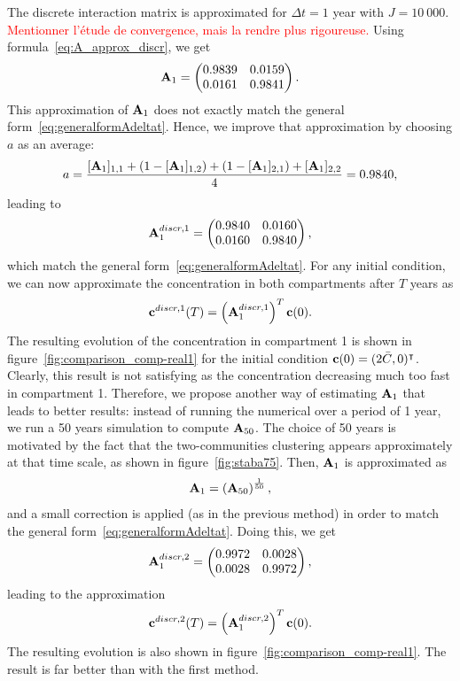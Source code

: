 The discrete interaction matrix is approximated for $\Delta t = 1$ year with $J = 10\ 000$. \textcolor{red}{Mentionner l'étude de convergence, mais la rendre plus rigoureuse.} Using formula~\eqref{eq:A_approx_discr}, we get
\begin{equation}
	\mathbf A_1 = \begin{pmatrix}
		0.9839 & 0.0159 \\ 
		0.0161 & 0.9841
	\end{pmatrix}.
\end{equation}
This approximation of $\mathbf A_1$ does not exactly match the general form~\eqref{eq:generalformAdeltat}. Hence, we improve that approximation by choosing $a$ as an average:
\begin{equation}
	a = \frac{[\mathbf A_1]_{1,1} + (1-[\mathbf A_1]_{1,2}) + (1 - [\mathbf A_1]_{2,1}) + [\mathbf A_1]_{2,2}}{4} = 0.9840,
\end{equation}
leading to
\begin{equation}
	\mathbf A_1^{discr,1} = \begin{pmatrix}
		0.9840 & 0.0160 \\ 
		0.0160 & 0.9840
	\end{pmatrix},
\end{equation}
which match the general form~\eqref{eq:generalformAdeltat}. For any initial condition, we can now approximate the concentration in both compartments after $T$ years as
\begin{equation}
	\mathbf c^{discr,1}(T) = \left(\mathbf A_1^{discr,1}\right)^T \mathbf c(0).
\end{equation}
The resulting evolution of the concentration in compartment 1 is shown in figure~\ref{fig:comparison_comp-real1} for the initial condition $\mathbf c(0) = (2\bar C,0)^\intercal$. Clearly, this result is not satisfying as the concentration decreasing much too fast in compartment 1. Therefore, we propose another way of estimating $\mathbf A_1$ that leads to better results: instead of running the numerical over a period of 1 year, we run a 50 years simulation to compute $\mathbf A_{50}$. The choice of 50 years is motivated by the fact that the two-communities clustering appears approximately at that time scale, as shown in figure~\ref{fig:staba75}. Then, $\mathbf A_1$ is approximated as
\begin{equation}
	\mathbf A_1 = \left(\mathbf A_{50}\right)^{\frac{1}{50}},
\end{equation}
and a small correction is applied (as in the previous method) in order to match the general form~\eqref{eq:generalformAdeltat}. Doing this, we get
\begin{equation}
	\mathbf A_1^{discr,2} = \begin{pmatrix}
		0.9972 & 0.0028 \\ 
		0.0028 & 0.9972
	\end{pmatrix},
\end{equation}
leading to the approximation
\begin{equation}
	\mathbf c^{discr,2}(T) = \left(\mathbf A_1^{discr,2}\right)^T \mathbf c(0).
\end{equation}
The resulting evolution is also shown in figure~\ref{fig:comparison_comp-real1}. The result is far better than with the first method.

